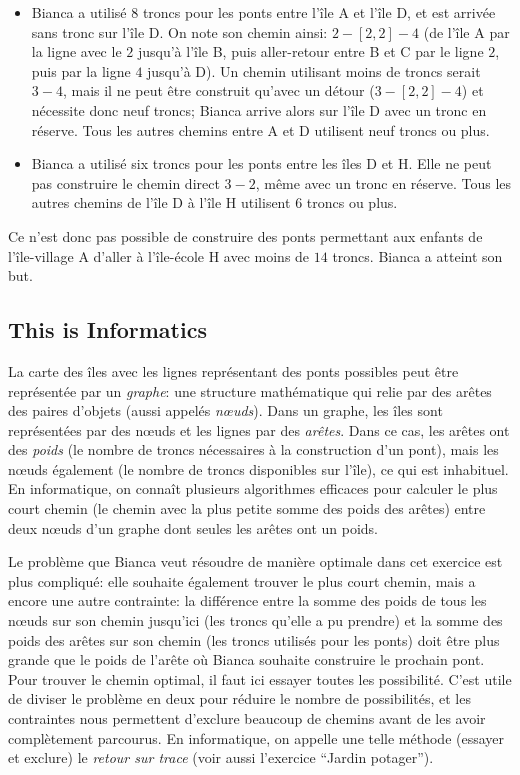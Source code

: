 \documentclass[a4paper,11pt]{report}
\begin{document}
\begin{itemize}
  \item Bianca a utilisé $8$ troncs pour les ponts entre l’île A et l’île D, et est arrivée sans tronc sur l’île D. On note son chemin ainsi: ${2-[2,2]-4}$ (de l’île A par la ligne avec le $2$ jusqu’à l’île B, puis aller-retour entre B et C par le ligne $2$, puis par la ligne $4$ jusqu’à D). Un chemin utilisant moins de troncs serait ${3-4}$, mais il ne peut être construit qu’avec un détour (${3-[2,2]-4}$) et nécessite donc neuf troncs; Bianca arrive alors sur l’île D avec un tronc en réserve. Tous les autres chemins entre A et D utilisent neuf troncs ou plus.
  \item Bianca a utilisé six troncs pour les ponts entre les îles D et H. Elle ne peut pas construire le chemin direct ${3-2}$, même avec un tronc en réserve. Tous les autres chemins de l’île D à l’île H utilisent $6$ troncs ou plus.
\end{itemize}

Ce n’est donc pas possible de construire des ponts permettant aux enfants de l’île-village A d’aller à l’île-école H avec moins de $14$ troncs. Bianca a atteint son but.


\subsection*{This is Informatics}

La carte des îles avec les lignes représentant des ponts possibles peut être représentée par un \emph{graphe}: une structure mathématique qui relie par des arêtes des paires d’objets (aussi appelés \emph{nœuds}). Dans un graphe, les îles sont représentées par des nœuds et les lignes par des \emph{arêtes}. Dans ce cas, les arêtes ont des \emph{poids} (le nombre de troncs nécessaires à la construction d’un pont), mais les nœuds également (le nombre de troncs disponibles sur l’île), ce qui est inhabituel. En informatique, on connaît plusieurs algorithmes efficaces pour calculer le plus court chemin (le chemin avec la plus petite somme des poids des arêtes) entre deux nœuds d’un graphe dont seules les arêtes ont un poids.

Le problème que Bianca veut résoudre de manière optimale dans cet exercice est plus compliqué: elle souhaite également trouver le plus court chemin, mais a encore une autre contrainte: la différence entre la somme des poids de tous les nœuds sur son chemin jusqu’ici (les troncs qu’elle a pu prendre) et la somme des poids des arêtes sur son chemin (les troncs utilisés pour les ponts) doit être plus grande que le poids de l’arête où Bianca souhaite construire le prochain pont. Pour trouver le chemin optimal, il faut ici essayer toutes les possibilité. C’est utile de diviser le problème en deux pour réduire le nombre de possibilités, et les contraintes nous permettent d’exclure beaucoup de chemins avant de les avoir complètement parcourus. En informatique, on appelle une telle méthode (essayer et exclure) le \emph{retour sur trace} (voir aussi l’exercice “Jardin potager”).
\end{document}
